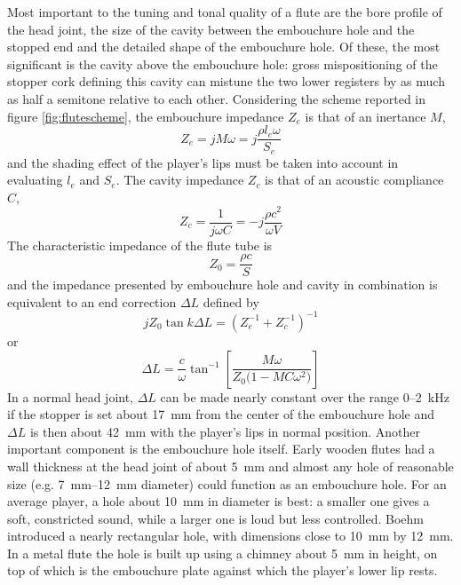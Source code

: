 Most important to the tuning and tonal quality of a flute are the bore profile of the head joint, the size of the cavity between the embouchure hole and the stopped end and the detailed shape of the embouchure hole. Of these, the most significant is the cavity above the embouchure hole: gross mispositioning of the stopper cork defining this cavity can mistune the two lower registers by as much as half a semitone relative to each other. Considering the scheme reported in figure \ref{fig:flutescheme}, the embouchure impedance \(Z_e\) is that of an inertance \(M\),
\[
Z_e = jM\omega = j\frac{\rho l_e \omega}{S_e}
\]
and the shading effect of the player’s lips must be taken into account in evaluating \(l_e\) and \(S_e\). The cavity impedance \(Z_c\) is that of an acoustic compliance \(C\),
\[
Z_c = \frac{1}{j\omega C} = -j\frac{\rho c^2}{\omega V}
\]
The characteristic impedance of the flute tube is
\[
Z_0 = \frac{\rho c}{S}
\]
and the impedance presented by embouchure hole and cavity in combination is equivalent to an end correction \(\Delta L\) defined by
\[
jZ_0\tan k\Delta L = (Z_e^{-1} + Z_c^{-1})^{-1}
\]
or
\[
\Delta L
= \frac{c}{\omega}\tan^{-1}\left[\frac{M\omega}{Z_0\bigl(1-MC\omega^2\bigr)}\right]
\]
In a normal head joint, \(\Delta L\) can be made nearly constant over the range \(0\)–\SI{2}{\kilo\hertz} if the stopper is set about \SI{17}{\milli\meter} from the center of the embouchure hole and \(\Delta L\) is then about \SI{42}{\milli\meter} with the player’s lips in normal position. Another important component is the embouchure hole itself. Early wooden flutes had a wall thickness at the head joint of about \SI{5}{\milli\meter} and almost any hole of reasonable size (e.g. \SIrange{7}{12}{\milli\meter} diameter) could function as an embouchure hole. For an average player, a hole about \SI{10}{\milli\meter} in diameter is best: a smaller one gives a soft, constricted sound, while a larger one is loud but less controlled. Boehm introduced a nearly rectangular hole, with dimensions close to \SI{10}{\milli\meter} by \SI{12}{\milli\meter}. In a metal flute the hole is built up using a chimney about \SI{5}{\milli\meter} in height, on top of which is the embouchure plate against which the player's lower lip rests.
